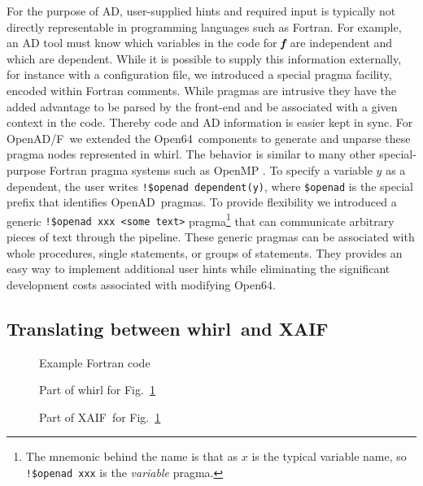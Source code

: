 \documentclass{book}
\newcommand{\OpenADF}{OpenAD/F}
\newcommand{\OpenAD}{OpenAD}
\newcommand{\OpenSixtyFour}{Open64}
\newcommand{\xaif}{XAIF}
\newcommand{\whirl}{whirl}
\newcommand{\bmf}{\mbox{\bf\em f}}
\newcommand{\code}[1]{{\small\tt{#1}}}
\newcommand{\reffig}[1]{{Fig.~\ref{#1}}}
\begin{document}
For the purpose of AD, user-supplied hints and required 
input is typically not directly
representable in programming languages such as Fortran.  
For example,
an AD tool must know which variables in the code for $\bmf$ are
independent and which are dependent. 
While it is possible to supply this information externally, 
for instance with a configuration file, we introduced a special
pragma facility, encoded within Fortran comments. 
While pragmas are intrusive they have the added advantage to be 
parsed by the front-end and be associated with a given context in the code.
Thereby code and AD information is easier kept in sync.  
For \OpenADF\ we extended the
\OpenSixtyFour\ components to generate and unparse these pragma nodes represented in \whirl.
The behavior is 
similar to many other special-purpose Fortran pragma systems such as
OpenMP \cite{openmpWeb}. 
To specify a variable
$y$ as a dependent, the user writes \code{!\$openad dependent(y)},
where \code{\$openad} is the special prefix that identifies \OpenAD\
pragmas.   
To provide flexibility we introduced a generic
\code{!\$openad xxx <some text>} pragma\footnote{
  The mnemonic behind the name is that
  as $x$ is the typical variable name, so \code{!\$openad xxx} is the
  {\em variable} pragma.} 
that can communicate arbitrary pieces of
text through the pipeline. 
These generic pragmas can be associated with whole procedures, 
single statements, or groups
of statements. They provides an easy way 
to implement additional user hints while eliminating the significant
development costs associated with modifying \OpenSixtyFour.

\subsection{Translating between \whirl\ and \xaif}\label{sssec:wtxxtw}

\begin{figure}
  \scriptsize
  \caption{Example Fortran code}\label{fig:exampleFortranCode}
\end{figure}

\begin{figure}
  \scriptsize
  \caption{Part of whirl for \reffig{fig:exampleFortranCode}}\label{fig:exampleWhirlCode}
\end{figure}

\begin{figure}
  \scriptsize
  \caption{Part of \xaif\ for \reffig{fig:exampleFortranCode}}\label{fig:exampleXaifCode}
\end{figure}
\end{document}
